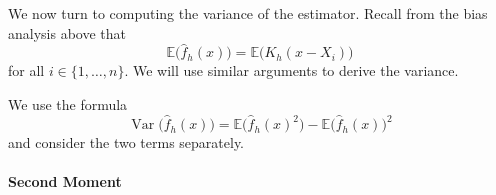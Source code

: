 \documentclass[
  a4paper,
]{article}
\theoremstyle{definition}
\theoremstyle{definition}
\theoremstyle{definition}
\theoremstyle{definition}
\theoremstyle{remark}
\begin{document}
We now turn to computing the variance of the estimator. Recall from the
bias analysis above that
\begin{equation}
  \mathbb{E}\bigl( \hat f_h(x) \bigr)
  = \mathbb{E}\bigl( K_h(x - X_i) \bigr)  \label{eq:E-hat-f-K-h}
\end{equation}
for all \(i \in \{1, \ldots, n\}\). We will use similar arguments to derive
the variance.

We use the formula
\begin{equation*}
  \mathop{\mathrm{Var}}\bigl( \hat f_h(x) \bigr)
  = \mathbb{E}\bigl( \hat f_h(x)^2 \bigr) - \mathbb{E}\bigl( \hat f_h(x) \bigr)^2
\end{equation*}
and consider the two terms separately.

\paragraph{Second Moment}\label{second-moment}
\end{document}
